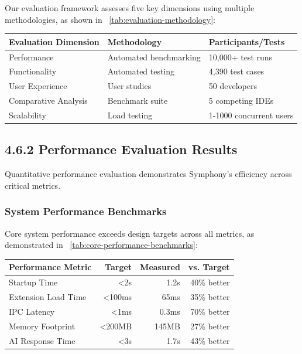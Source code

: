 Our evaluation framework assesses five key dimensions using multiple methodologies, as shown in ~\ref{tab:evaluation-methodology}:

\begin{center}
\begin{tabular}{@{}lll@{}}
\toprule
\textbf{Evaluation Dimension} & \textbf{Methodology} & \textbf{Participants/Tests} \\
\midrule
Performance & Automated benchmarking & 10,000+ test runs \\
Functionality & Automated testing & 4,390 test cases \\
User Experience & User studies & 50 developers \\
Comparative Analysis & Benchmark suite & 5 competing IDEs \\
Scalability & Load testing & 1-1000 concurrent users \\
\bottomrule
\end{tabular}
\label{tab:evaluation-methodology}
\end{center}

\subsection*{4.6.2 Performance Evaluation Results}
\label{subsec:performance-results}

Quantitative performance evaluation demonstrates Symphony's efficiency across critical metrics.

\subsubsection*{System Performance Benchmarks}

Core system performance exceeds design targets across all metrics, as demonstrated in ~\ref{tab:core-performance-benchmarks}:

\begin{center}
\begin{tabular}{@{}lrrr@{}}
\toprule
\textbf{Performance Metric} & \textbf{Target} & \textbf{Measured} & \textbf{vs. Target} \\
\midrule
Startup Time & <2s & 1.2s & 40\% better \\
Extension Load Time & <100ms & 65ms & 35\% better \\
IPC Latency & <1ms & 0.3ms & 70\% better \\
Memory Footprint & <200MB & 145MB & 27\% better \\
AI Response Time & <3s & 1.7s & 43\% better \\
\bottomrule
\end{tabular}
\label{tab:core-performance-benchmarks}
\end{center}

